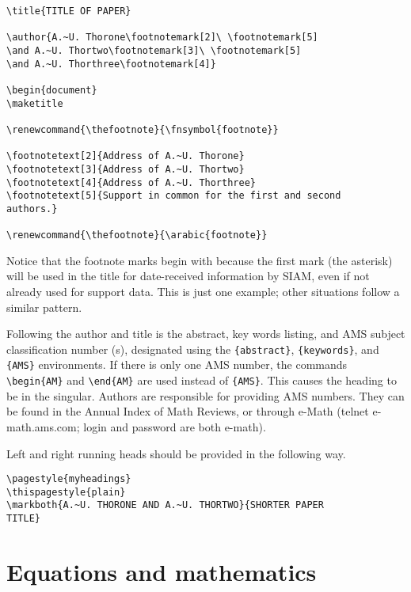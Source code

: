 \documentclass[]{article}
\begin{document}
\begin{verbatim}
\title{TITLE OF PAPER}

\author{A.~U. Thorone\footnotemark[2]\ \footnotemark[5]
\and A.~U. Thortwo\footnotemark[3]\ \footnotemark[5]
\and A.~U. Thorthree\footnotemark[4]}

\begin{document}
\maketitle

\renewcommand{\thefootnote}{\fnsymbol{footnote}}

\footnotetext[2]{Address of A.~U. Thorone}
\footnotetext[3]{Address of A.~U. Thortwo}
\footnotetext[4]{Address of A.~U. Thorthree}
\footnotetext[5]{Support in common for the first and second
authors.}

\renewcommand{\thefootnote}{\arabic{footnote}}
\end{verbatim}

Notice that the footnote marks begin with because the first mark (the
asterisk) will be used in the title for date-received information by
SIAM, even if not already used for support data. This is just one
example; other situations follow a similar pattern.

Following the author and title is the abstract, key words listing, and
AMS subject classification number (s), designated using the
\texttt{\{abstract\}}, \texttt{\{keywords\}}, and \texttt{\{AMS\}}
environments. If there is only one AMS number, the commands
\texttt{\textbackslash{}begin\{AM\}} and
\texttt{\textbackslash{}end\{AM\}} are used instead of \texttt{\{AMS\}}.
This causes the heading to be in the singular. Authors are responsible
for providing AMS numbers. They can be found in the Annual Index of Math
Reviews, or through {e-Math} ({telnet e-math.ams.com}; login and
password are both {e-math}).

Left and right running heads should be provided in the following way.

\begin{verbatim}
\pagestyle{myheadings}
\thispagestyle{plain}
\markboth{A.~U. THORONE AND A.~U. THORTWO}{SHORTER PAPER
TITLE} 
\end{verbatim}

\section{Equations and mathematics}\label{equations-and-mathematics}
\end{document}
